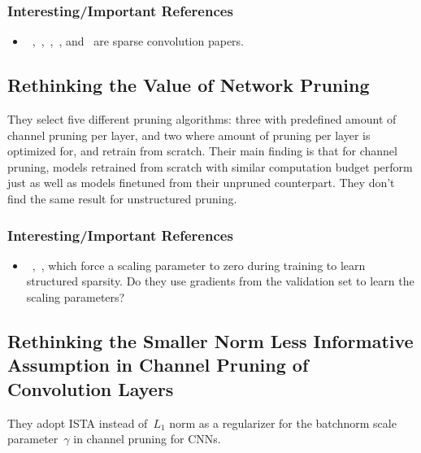 \documentclass[a4paper, 12pt]{article}
\begin{document}
\subsubsection{Interesting/Important References}

\begin{itemize}
        \item~\cite{changpinyo2017thepower},~\cite{liu2015sparse},~\cite{scardapane2016group},~\cite{wen2016learning},
                and~\cite{zhou2016less} are sparse convolution papers.
\end{itemize}


\subsection{Rethinking the Value of Network Pruning~\cite{liu2018rethinking}}

They select five different pruning algorithms: three with predefined amount of
channel pruning per layer, and two where amount of pruning per layer is
optimized for, and retrain from scratch. Their main finding is that for channel
pruning, models retrained from scratch with similar computation budget perform
just as well as models finetuned from their unpruned counterpart. They don't
find the same result for unstructured pruning.


\subsubsection{Interesting/Important References}

\begin{itemize}
        \item~\cite{huang2018datadriven},~\cite{ye2018rethinking}, which force
                a scaling parameter to zero during training to learn structured
                sparsity. Do they use gradients from the validation set to
                learn the scaling parameters?
\end{itemize}


\subsection{Rethinking the Smaller Norm Less Informative Assumption in Channel
            Pruning of Convolution Layers~\cite{ye2018rethinking}}

They adopt ISTA instead of~$L_1$ norm as a regularizer for the batchnorm scale
parameter~$\gamma$ in channel pruning for CNNs.
\end{document}
